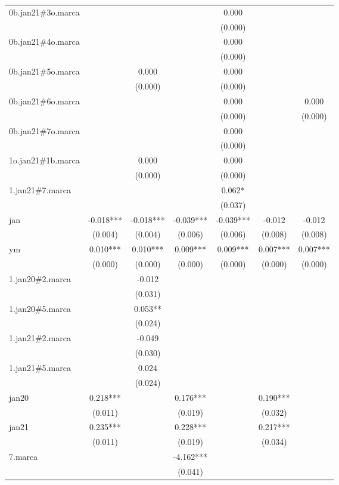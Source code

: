 \begin{tabular}{lcccccc}
0b.jan21\#3o.marca &  &  &  & 0.000 &  &  \\
 &  &  &  & (0.000) &  &  \\
0b.jan21\#4o.marca &  &  &  & 0.000 &  &  \\
 &  &  &  & (0.000) &  &  \\
0b.jan21\#5o.marca &  & 0.000 &  & 0.000 &  &  \\
 &  & (0.000) &  & (0.000) &  &  \\
0b.jan21\#6o.marca &  &  &  & 0.000 &  & 0.000 \\
 &  &  &  & (0.000) &  & (0.000) \\
0b.jan21\#7o.marca &  &  &  & 0.000 &  &  \\
 &  &  &  & (0.000) &  &  \\
1o.jan21\#1b.marca &  & 0.000 &  & 0.000 &  &  \\
 &  & (0.000) &  & (0.000) &  &  \\
1.jan21\#7.marca &  &  &  & 0.062* &  &  \\
 &  &  &  & (0.037) &  &  \\
jan & -0.018*** & -0.018*** & -0.039*** & -0.039*** & -0.012 & -0.012 \\
 & (0.004) & (0.004) & (0.006) & (0.006) & (0.008) & (0.008) \\
ym & 0.010*** & 0.010*** & 0.009*** & 0.009*** & 0.007*** & 0.007*** \\
 & (0.000) & (0.000) & (0.000) & (0.000) & (0.000) & (0.000) \\
1.jan20\#2.marca &  & -0.012 &  &  &  &  \\
 &  & (0.031) &  &  &  &  \\
1.jan20\#5.marca &  & 0.053** &  &  &  &  \\
 &  & (0.024) &  &  &  &  \\
1.jan21\#2.marca &  & -0.049 &  &  &  &  \\
 &  & (0.030) &  &  &  &  \\
1.jan21\#5.marca &  & 0.024 &  &  &  &  \\
 &  & (0.024) &  &  &  &  \\
jan20 & 0.218*** &  & 0.176*** &  & 0.190*** &  \\
 & (0.011) &  & (0.019) &  & (0.032) &  \\
jan21 & 0.235*** &  & 0.228*** &  & 0.217*** &  \\
 & (0.011) &  & (0.019) &  & (0.034) &  \\
7.marca &  &  & -4.162*** &  &  &  \\
 &  &  & (0.041) &  &  &  \\

\end{tabular}
